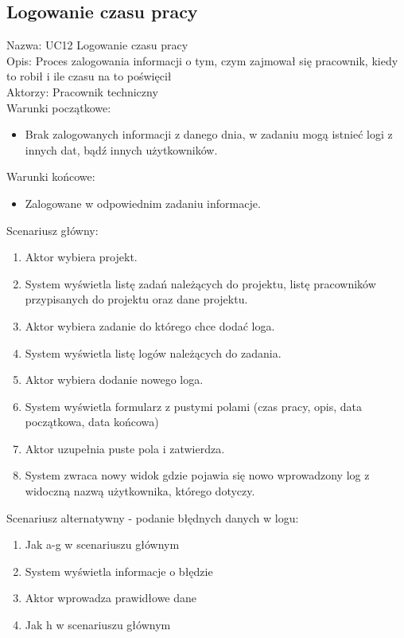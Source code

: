 \subsection{Logowanie czasu pracy}
Nazwa: UC12 Logowanie czasu pracy\\
Opis: Proces zalogowania informacji o tym, czym zajmował się pracownik, kiedy to robił i ile czasu na to poświęcił \\
Aktorzy: Pracownik techniczny \\
Warunki początkowe:
\begin{itemize}
\item Brak zalogowanych informacji z danego dnia, w zadaniu mogą istnieć logi z innych dat, bądź innych użytkowników.
\end{itemize}
Warunki końcowe:
\begin{itemize}
\item Zalogowane w odpowiednim zadaniu informacje.
\end{itemize}
Scenariusz główny:
\begin{enumerate}
\item Aktor wybiera projekt.
\item System wyświetla listę zadań należących do projektu, listę pracowników przypisanych do projektu oraz dane projektu.
\item Aktor wybiera zadanie do którego chce dodać loga.
\item System wyświetla listę logów należących do zadania.
\item Aktor wybiera dodanie nowego loga.
\item System wyświetla formularz z pustymi polami (czas pracy, opis, data początkowa, data końcowa)
\item Aktor uzupełnia puste pola i zatwierdza.
\item System zwraca nowy widok gdzie pojawia się nowo wprowadzony log z widoczną nazwą użytkownika, którego dotyczy.
\end{enumerate}
Scenariusz alternatywny - podanie błędnych danych w logu: 
\begin{enumerate}
\item Jak a-g w scenariuszu głównym
\item System wyświetla informacje o błędzie
\item Aktor wprowadza prawidłowe dane
\item Jak h w scenariuszu głównym
\end{enumerate}

